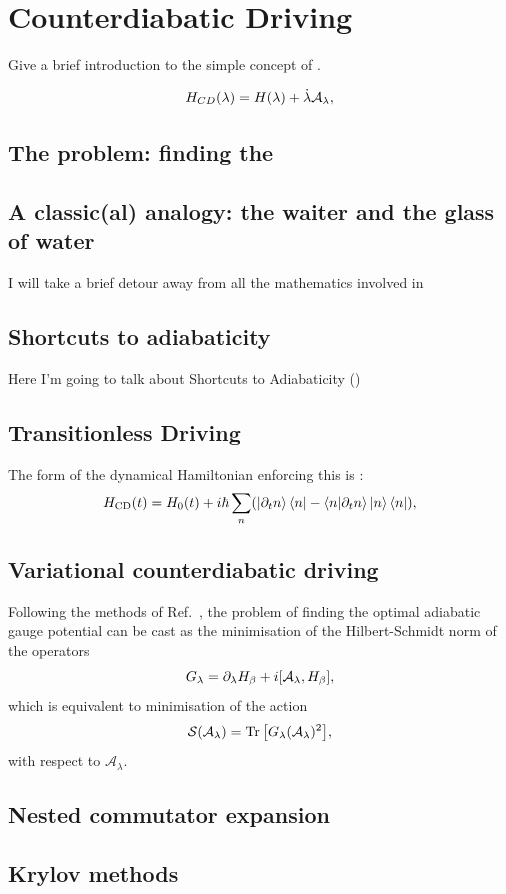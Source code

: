     \section{Counterdiabatic Driving}\label{sec:2.3_CD}

    Give a brief introduction to the simple concept of .

    \begin{equation}\label{eq:CD_Hamiltonian}
    H_{CD}(\lambda) = H(\lambda) + \dot{\lambda} \mathcal{A}_\lambda,
    \end{equation}

    \subsection{The problem: finding the }

    \subsection{A classic(al) analogy: the waiter and the glass of water}

    I will take a brief detour away from all the mathematics involved in 

    \subsection{Shortcuts to adiabaticity}
    
    Here I'm going to talk about Shortcuts to Adiabaticity 
    ()
    
    \subsection{Transitionless Driving}
    The form of the dynamical Hamiltonian enforcing this is \cite{berry_transitionless_2009}:
    \begin{equation}\label{eq:counterdiabatic}
        H_{\mathrm{CD}}(t) = H_0 (t) + i\hbar \sum_n (\ket{\partial_t n}\bra{n} - \bra{n}\ket{\partial_t n}\ket{n}\bra{n}),
    \end{equation}
    \subsection{Variational counterdiabatic driving}
    Following the methods of Ref.~\cite{sels_minimizing_2017}, the problem of finding the optimal adiabatic gauge potential can be cast as the minimisation of the Hilbert-Schmidt norm of the operators
    \begin{equation}\label{eq:Goperator}
     G_{\lambda}= \dlambda H_\beta + i\comm{\mathcal{A}_\lambda}{H_\beta},
    \end{equation}
    which is equivalent to minimisation of the action
    \begin{equation}\label{eq:actionCD}
    \mathcal{S}(\mathcal{A}_{\lambda}) = \Trace{\left[G_{\lambda}(\mathcal{A}_{\lambda})^2\right]},
    \end{equation}
    with respect to $\mathcal{A}_{\lambda}$.
    \subsection{Nested commutator expansion}
    \subsection{Krylov methods}
